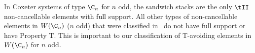 \begin{remark}\label{rem:noncancel}
	 In Coxeter systems of type $\C_n$ for $n$ odd, the sandwich stacks are the only $\tII$ non-cancellable elements with full support. All other types of non-cancellable elements in $W(\C_n)$ ($n$ odd) that were classified in~\cite{Ernst2010} do not have full support or have Property T. This is important to our classification of T-avoiding elements in $W(\C_n)$ for $n$ odd.
\end{remark}



%
%	
%	
%
%	
%	

